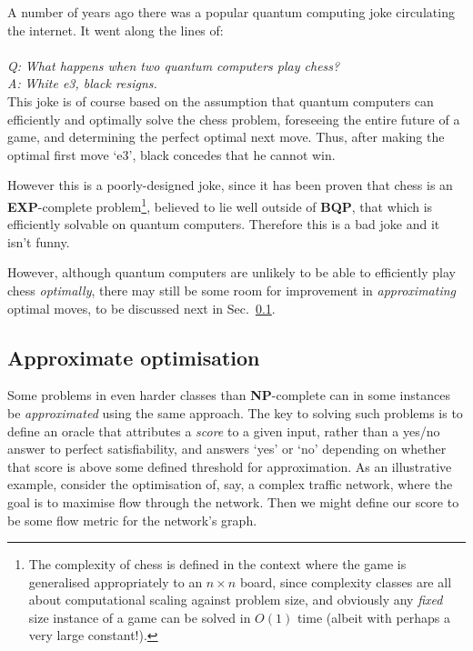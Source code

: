 A number of years ago there was a popular quantum computing joke circulating the internet. It went along the lines of:
\\
\\
\textit{Q:\,\,What happens when two quantum computers play chess?}\\
\textit{A:\,\,White e3, black resigns.}
\\

This joke is of course based on the assumption that quantum computers can efficiently and optimally solve the chess problem, foreseeing the entire future of a game, and determining the perfect optimal next move. Thus, after making the optimal first move `e3', black concedes that he cannot win.

However this is a poorly-designed joke, since it has been proven that chess is an \textbf{EXP}-complete problem\footnote{The complexity of chess is defined in the context where the game is generalised appropriately to an \mbox{$n\times n$} board, since complexity classes are all about computational scaling against problem size, and obviously any \textit{fixed} size instance of a game can be solved in $O(1)$ time (albeit with perhaps a very large constant!).}, believed to lie well outside of \textbf{BQP}, that which is efficiently solvable on quantum computers. Therefore this is a bad joke and it isn't funny.

However, although quantum computers are unlikely to be able to efficiently play chess \textit{optimally}, there may still be some room for improvement in \textit{approximating} optimal moves, to be discussed next in Sec.~\ref{sec:approx_optim}.

\subsection{Approximate optimisation}\label{sec:approx_optim}

Some problems in even harder classes than \textbf{NP}-complete can in some instances be \textit{approximated} using the same approach. The key to solving such problems is to define an oracle that attributes a \textit{score} to a given input, rather than a yes/no answer to perfect satisfiability, and answers `yes' or `no' depending on whether that score is above some defined threshold for approximation. As an illustrative example, consider the optimisation of, say, a complex traffic network, where the goal is to maximise flow through the network. Then we might define our score to be some flow metric for the network's graph.

